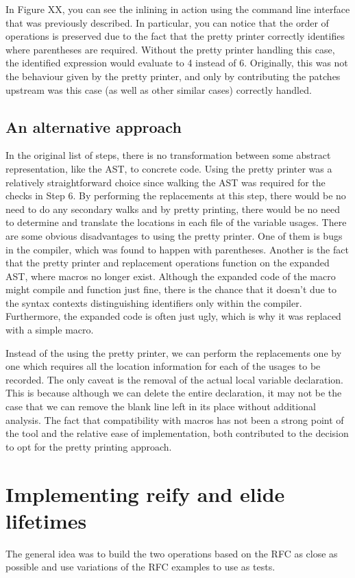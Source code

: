In Figure XX, you can see the inlining in action using the command line interface that was previously described. In particular, you can notice that the order of operations is preserved due to the fact that the pretty printer correctly identifies where parentheses are required. Without the pretty printer handling this case, the identified expression would evaluate to 4 instead of 6. Originally, this was not the behaviour given by the pretty printer, and only by contributing the patches upstream was this case (as well as other similar cases) correctly handled.

\subsection{An alternative approach}
In the original list of steps, there is no transformation between some abstract representation, like the AST, to concrete code. Using the pretty printer was a relatively straightforward choice since walking the AST was required for the checks in Step 6. By performing the replacements at this step, there would be no need to do any secondary walks and by pretty printing, there would be no need to determine and translate the locations in each file of the variable usages. There are some obvious disadvantages to using the pretty printer. One of them is bugs in the compiler, which was found to happen with parentheses. Another is the fact that the pretty printer and replacement operations function on the expanded AST, where macros no longer exist. Although the expanded code of the macro might compile and function just fine, there is the chance that it doesn't due to the syntax contexts distinguishing identifiers only within the compiler. Furthermore, the expanded code is often just ugly, which is why it was replaced with a simple macro.

Instead of the using the pretty printer, we can perform the replacements one by one which requires all the location information for each of the usages to be recorded. The only caveat is the removal of the actual local variable declaration. This is because although we can delete the entire declaration, it may not be the case that we can remove the blank line left in its place without additional analysis. The fact that compatibility with macros has not been a strong point of the tool and the relative ease of implementation, both contributed to the decision to opt for the pretty printing approach.

\section{Implementing reify and elide lifetimes}
The general idea was to build the two operations based on the RFC as close as possible and use variations of the RFC examples to use as tests.

